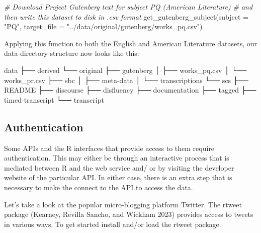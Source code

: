\documentclass[
  letterpaper,
]{scrbook}
\newenvironment{Shaded}{\begin{snugshade}}{\end{snugshade}}
\newcommand{\AttributeTok}[1]{\textcolor[rgb]{0.00,0.00,0.00}{#1}}
\newcommand{\CommentTok}[1]{\textcolor[rgb]{0.00,0.00,0.00}{\textit{#1}}}
\newcommand{\ExtensionTok}[1]{\textcolor[rgb]{0.00,0.00,0.00}{#1}}
\newcommand{\FunctionTok}[1]{\textcolor[rgb]{0.00,0.00,0.00}{#1}}
\newcommand{\NormalTok}[1]{\textcolor[rgb]{0.00,0.00,0.00}{#1}}
\newcommand{\StringTok}[1]{\textcolor[rgb]{0.00,0.00,0.00}{#1}}
\begin{document}
\begin{Shaded}
\begin{Highlighting}[]
\CommentTok{\# Download Project Gutenberg text for subject \textquotesingle{}PQ\textquotesingle{} (American Literature)}
\CommentTok{\# and then write this dataset to disk in .csv format}
\FunctionTok{get\_gutenberg\_subject}\NormalTok{(}\AttributeTok{subject =} \StringTok{"PQ"}\NormalTok{, }\AttributeTok{target\_file =} \StringTok{"../data/original/gutenberg/works\_pq.csv"}\NormalTok{)}
\end{Highlighting}
\end{Shaded}

Applying this function to both the English and American Literature
datasets, our data directory structure now looks like this:

\begin{Shaded}
\begin{Highlighting}[]
\ExtensionTok{data}
\ExtensionTok{├──}\NormalTok{ derived}
\ExtensionTok{└──}\NormalTok{ original}
    \ExtensionTok{├──}\NormalTok{ gutenberg}
    \ExtensionTok{│}\NormalTok{   ├── works\_pq.csv}
    \ExtensionTok{│}\NormalTok{   └── works\_pr.csv}
    \ExtensionTok{├──}\NormalTok{ sbc}
    \ExtensionTok{│}\NormalTok{   ├── meta{-}data}
    \ExtensionTok{│}\NormalTok{   └── transcriptions}
    \ExtensionTok{└──}\NormalTok{ scs}
        \ExtensionTok{├──}\NormalTok{ README}
        \ExtensionTok{├──}\NormalTok{ discourse}
        \ExtensionTok{├──}\NormalTok{ disfluency}
        \ExtensionTok{├──}\NormalTok{ documentation}
        \ExtensionTok{├──}\NormalTok{ tagged}
        \ExtensionTok{├──}\NormalTok{ timed{-}transcript}
        \ExtensionTok{└──}\NormalTok{ transcript}
\end{Highlighting}
\end{Shaded}

\hypertarget{authentication}{%
\subsection{Authentication}\label{authentication}}

Some APIs and the R interfaces that provide access to them require
authentication. This may either be through an interactive process that
is mediated between R and the web service and/ or by visiting the
developer website of the particular API. In either case, there is an
extra step that is necessary to make the connect to the API to access
the data.

Let's take a look at the popular micro-blogging platform Twitter. The
rtweet package (Kearney, Revilla Sancho, and Wickham 2023) provides
access to tweets in various ways. To get started install and/or load the
rtweet package.
\end{document}
